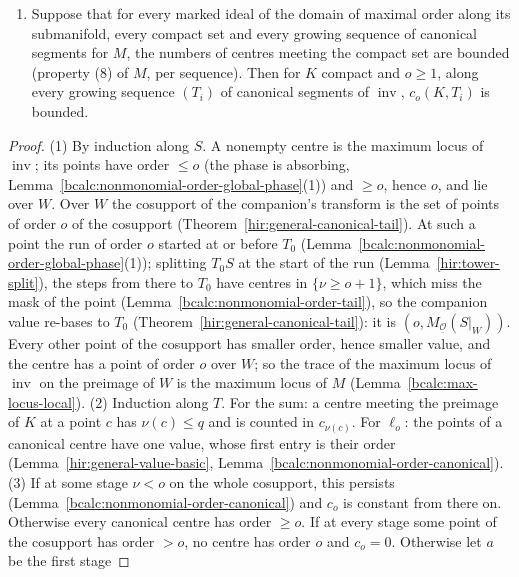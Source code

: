 \begin{lemma}
\begin{enumerate}
Lemma~\ref{bcalc:general-phase-count}(2), the number of centres meeting the preimage of \(K\) is at most \(\sum_{o\le q}c_o(K,T)\), and \(c_o(K,T)\le\ell_o(T)\).
\item Suppose that for every marked ideal of the domain of maximal order along its submanifold, every compact set and every growing sequence of canonical segments for
\(M\), the numbers of centres meeting the compact set are bounded (property (8) of \(M\), per sequence). Then for \(K\) compact and \(o\ge1\), along every growing
sequence \((T_i)\) of canonical segments of \(\operatorname{inv}\), \(c_o(K,T_i)\) is bounded.
\end{enumerate}
\end{lemma}
\begin{proof}
\upstreamleanok
(1) By induction along \(S\). A nonempty centre is the maximum locus of \(\operatorname{inv}\); its points have order \(\le o\) (the phase is absorbing,
Lemma~\ref{bcalc:nonmonomial-order-global-phase}(1)) and \(\ge o\), hence \(o\), and lie over \(W\). Over \(W\) the cosupport of the companion's transform is the set of points of
order \(o\) of the cosupport (Theorem~\ref{hir:general-canonical-tail}). At such a point the run of order \(o\) started at or before \(T_0\)
(Lemma~\ref{bcalc:nonmonomial-order-global-phase}(1)); splitting \(T_0S\) at the start of the run (Lemma~\ref{hir:tower-split}), the steps from there to \(T_0\) have centres in
\(\{\nu\ge o+1\}\), which miss the mask of the point (Lemma~\ref{bcalc:nonmonomial-order-tail}), so the companion value re-bases to \(T_0\)
(Theorem~\ref{hir:general-canonical-tail}): it is \((o,M_{\underline{\mathcal O}}(S|_W))\). Every other point of the cosupport has smaller order, hence smaller value, and the centre
has a point of order \(o\) over \(W\); so the trace of the maximum locus of \(\operatorname{inv}\) on the preimage of \(W\) is the maximum locus of \(M\)
(Lemma~\ref{bcalc:max-locus-local}).
(2) Induction along \(T\). For the sum: a centre meeting the preimage of \(K\) at a point \(c\) has \(\nu(c)\le q\) and is counted in \(c_{\nu(c)}\). For \(\ell_o\): the points of a
canonical centre have one value, whose first entry is their order (Lemma~\ref{hir:general-value-basic}, Lemma~\ref{bcalc:nonmonomial-order-canonical}).
(3) If at some stage \(\nu<o\) on the whole cosupport, this persists (Lemma~\ref{bcalc:nonmonomial-order-canonical}) and \(c_o\) is constant from there on. Otherwise every
canonical centre has order \(\ge o\). If at every stage some point of the cosupport has order \(>o\), no centre has order \(o\) and \(c_o=0\). Otherwise let \(a\) be the first stage

\end{proof}
